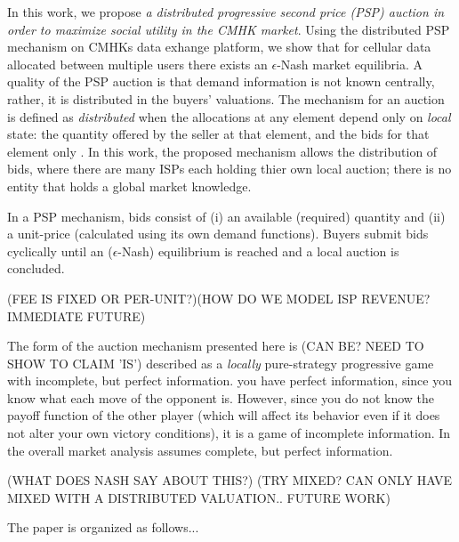 \documentclass[12pt]{article}
\theoremstyle{definition}
\begin{document}
\begin{multicols}{2}
In this work, we propose \emph{a distributed progressive second price (PSP) auction in
order to maximize social utility in the CMHK market}. Using the
distributed PSP mechanism on CMHKs data
exhange platform, we show that for cellular data allocated between multiple users there
exists an $\epsilon$-Nash market equilibria. A quality of the PSP auction is that
demand information is not known centrally, rather, it is distributed in the
buyers' valuations. The mechanism for an auction is defined
as \emph{distributed} when the allocations at any element depend only on
\emph{local} state: the quantity offered by the seller at that element, and the
bids for that element only \cite{lazar}. In this work, the proposed mechanism
allows the distribution of bids, where there are many ISPs each holding
thier own local auction; there is no entity that holds a global market knowledge.

In a PSP mechanism, bids consist of (i) an available (required) quantity and (ii) a unit-price (calculated
using its own demand functions). Buyers submit bids cyclically until an
($\epsilon$-Nash) equilibrium is reached and a local auction is concluded. 

(FEE IS FIXED OR
PER-UNIT?)(HOW DO WE MODEL ISP REVENUE? IMMEDIATE FUTURE)

The form of the auction mechanism presented here is (CAN BE? NEED TO SHOW TO
CLAIM 'IS') described as a \emph{locally}
pure-strategy progressive game with incomplete, but perfect information.
 you have perfect information, since you know what each move of the opponent is.
However, since you do not know the payoff function of the other player (which
will affect its behavior even if it does not alter your own victory conditions),
it is a game of incomplete information.
In the overall market analysis assumes complete, but perfect information.
 
 (WHAT
DOES NASH SAY ABOUT THIS?) (TRY MIXED? CAN ONLY HAVE MIXED WITH A DISTRIBUTED
VALUATION.. FUTURE WORK) 

The paper is organized as follows...


\end{multicols}
\end{document}
